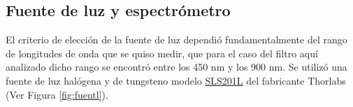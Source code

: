 
\singlespacing
\subsection{Fuente de luz y espectrómetro \href{https://github.com/jrr1984/defects_analysis/blob/master/light_sources_spectrum.py}{\faGithub}}
\label{sec:fteluzyesp}

\hspace{0.5cm}El criterio de elección de la fuente de luz dependió fundamentalmente del rango de longitudes de onda que se quiso medir, que para el caso del filtro aquí analizado dicho rango se encontró entre los 450 nm y los 900 nm.
Se utilizó una fuente de luz halógena y de tungsteno modelo \href{https://www.thorlabs.com/newgrouppage9.cfm?objectgroup_id=7269&pn=SLS201L/M}{SLS201L} del fabricante Thorlabs (Ver Figura \ref{fig:fuentl}). 

